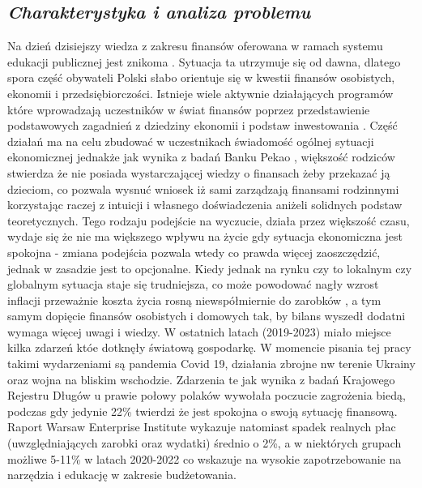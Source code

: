 \documentclass[a4paper, 10pt, twoside, openright]{report}
\newcommand{\customstylechapter}[1]{\large{\textit{#1}}}
\begin{document}
\begin{large}
\chapter{\customstylechapter{Charakterystyka i analiza problemu}}

{Na dzień dzisiejszy wiedza z zakresu finansów oferowana w ramach systemu 
edukacji publicznej jest znikoma \cite{edukacjafinansowawszkołach}. Sytuacja ta 
utrzymuje się od dawna, dlatego spora część obywateli Polski słabo orientuje się
 w kwestii finansów osobistych, ekonomii i przedsiębiorczości. Istnieje wiele 
aktywnie działających programów które wprowadzają uczestników w świat finansów 
poprzez przedstawienie podstawowych zagadnień z dziedziny ekonomii i podstaw 
inwestowania \cite{edukacjafinansowawszkołach}. Część działań ma na celu zbudować 
w uczestnikach świadomość ogólnej sytuacji ekonomicznej jednakże jak wynika z 
badań Banku Pekao \cite{edukacjafinansowamlodziezy}, większość rodziców stwierdza
 że nie posiada wystarczającej wiedzy o finansach żeby przekazać ją dzieciom, 
co pozwala wysnuć wniosek iż sami zarządzają finansami rodzinnymi korzystając 
raczej z intuicji i własnego doświadczenia aniżeli solidnych podstaw 
teoretycznych. Tego rodzaju podejście na wyczucie, działa przez większość czasu, 
wydaje się że nie ma większego wpływu na życie gdy sytuacja ekonomiczna jest 
spokojna - zmiana podejścia pozwala wtedy co prawda więcej zaoszczędzić, jednak 
w zasadzie jest to opcjonalne. Kiedy jednak na rynku czy to lokalnym czy 
globalnym sytuacja staje się trudniejsza, co może powodować nagły wzrost 
inflacji przeważnie koszta życia rosną niewspółmiernie do 
zarobków \cite{gussytuacjabudzetowa}\cite{koszty2010-22}, a tym samym dopięcie 
finansów osobistych i domowych tak, by bilans wyszedł dodatni wymaga więcej 
uwagi i wiedzy. W ostatnich latach (2019-2023) miało miejsce kilka zdarzeń któe 
dotknęły światową gospodarkę. W momencie pisania tej pracy takimi wydarzeniami 
są pandemia Covid 19, działania zbrojne nw terenie Ukrainy oraz wojna na bliskim
 wschodzie. Zdarzenia te jak wynika z badań Krajowego Rejestru Długów 
\cite{portfelpolakawpandemii} u prawie połowy polaków wywołała poczucie 
zagrożenia biedą, podczas gdy jedynie 22\% twierdzi że jest spokojna o swoją 
sytuację finansową. Raport Warsaw Enterprise Institute \cite{weiinflacja} 
wykazuje natomiast spadek realnych płac (uwzględniających zarobki oraz wydatki) 
średnio o 2\%, a w niektórych grupach możliwe 5-11\% w latach 2020-2022 co 
wskazuje na wysokie zapotrzebowanie na narzędzia i edukację w zakresie 
budżetowania.}


\end{large}
\end{document}
